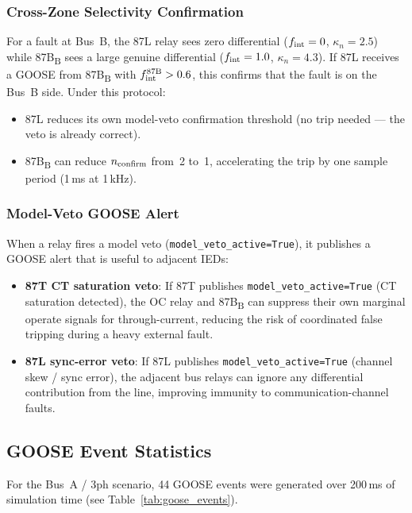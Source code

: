 \documentclass[12pt,a4paper]{article}
\newcommand{\kn}{\kappa_n}
\newcommand{\fint}{f_{\rm int}}
\begin{document}
\subsubsection{Cross-Zone Selectivity Confirmation}

For a fault at Bus~B, the 87L relay sees zero differential
($\fint = 0$, $\kn = 2.5$) while 87B\textsubscript{B} sees a large
genuine differential ($\fint = 1.0$, $\kn = 4.3$).  If 87L receives
a GOOSE from 87B\textsubscript{B} with $f_{\rm int}^{87\rm B} > 0.6$, this
confirms that the fault is on the Bus~B side.  Under this protocol:
\begin{itemize}
  \item 87L reduces its own model-veto confirmation threshold
    (no trip needed — the veto is already correct).
  \item 87B\textsubscript{B} can reduce $n_{\rm confirm}$ from~2 to~1,
    accelerating the trip by one sample period (1\,ms at 1\,kHz).
\end{itemize}

\subsubsection{Model-Veto GOOSE Alert}

When a relay fires a model veto (\texttt{model\_veto\_active=True}), it
publishes a GOOSE alert that is useful to adjacent IEDs:

\begin{itemize}
  \item \textbf{87T CT saturation veto}: If 87T publishes
    \texttt{model\_veto\_active=True} (CT saturation detected), the OC
    relay and 87B\textsubscript{B} can suppress their own marginal
    operate signals for through-current, reducing the risk of coordinated
    false tripping during a heavy external fault.

  \item \textbf{87L sync-error veto}: If 87L publishes
    \texttt{model\_veto\_active=True} (channel skew / sync error), the
    adjacent bus relays can ignore any differential contribution from the
    line, improving immunity to communication-channel faults.
\end{itemize}

\subsection{GOOSE Event Statistics}

For the Bus~A / 3ph scenario, 44 GOOSE events were generated over
200\,ms of simulation time (see Table~\ref{tab:goose_events}).
\end{document}
